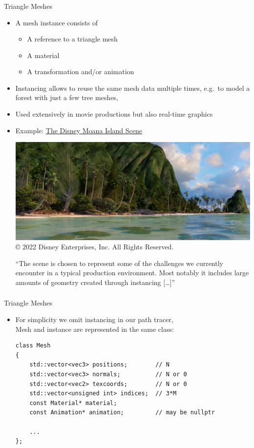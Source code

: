 \documentclass[utf8,stillsansserifmath,fleqn,t]{beamer}
\begin{document}
\begin{frame}
\frametitle{\insertsection}
Triangle Meshes
\begin{itemize}
\item A mesh instance consists of
    \begin{itemize}
    \item A reference to a triangle mesh
    \item A material
    \item A transformation and/or animation
    \end{itemize}
\item Instancing allows to reuse the same mesh data multiple times,
e.g.~to model a forest with just a few tree meshes,%
\item Used extensively in movie productions but also real-time graphics
\item Example:
\href{https://www.disneyanimation.com/resources/moana-island-scene/}{The Disney
Moana Island Scene}\\
\begin{minipage}{.5\textwidth}
\includegraphics[width=\textwidth]{./fig/disney-moana-example.jpg}
{\tiny © 2022 Disney Enterprises, Inc. All Rights Reserved.}
\end{minipage}\hfill
\begin{minipage}{.42\textwidth}
``The scene is chosen to represent some of the challenges we currently
encounter in a typical production environment. Most notably it includes large
amounts of geometry created through instancing [\ldots{}]''
\end{minipage}
\end{itemize}
\end{frame}

\begin{frame}[fragile,label=triangle-mesh-0]
\frametitle{\insertsection}
Triangle Meshes
\begin{itemize}
\item For simplicity we omit instancing in our path tracer,\\
Mesh and instance are represented in the same class:
\begin{lstlisting}
class Mesh
{
    std::vector<vec3> positions;        // N
    std::vector<vec3> normals;          // N or 0
    std::vector<vec2> texcoords;        // N or 0
    std::vector<unsigned int> indices;  // 3*M
    const Material* material;
    const Animation* animation;         // may be nullptr

    ...
};
\end{lstlisting}
\end{itemize}
\end{frame}
\end{document}
